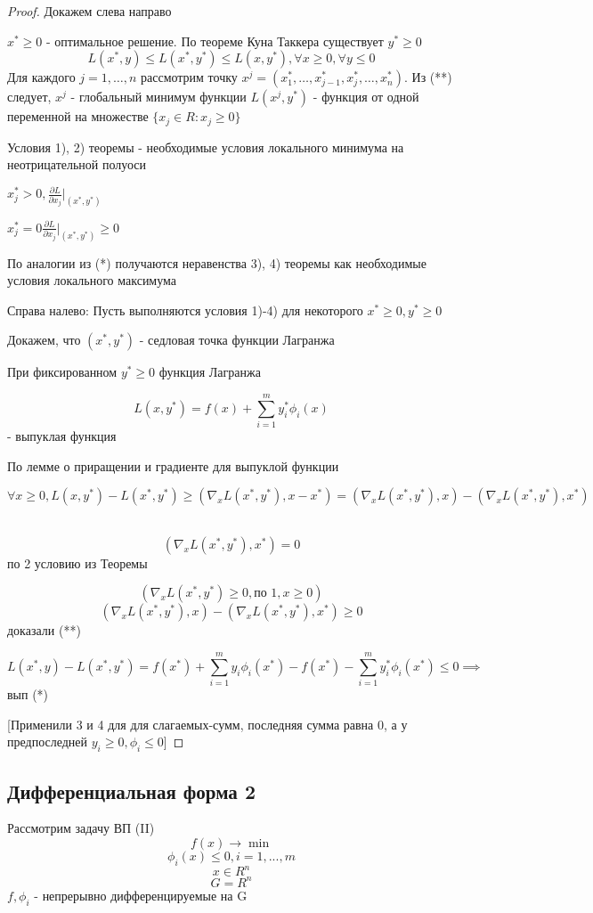 \documentclass[a4paper]{article}
\theoremstyle{definition}
\theoremstyle{remark}
\begin{document}
\begin{proof}
    Докажем слева направо 

    $x^*\ge 0$ - оптимальное решение. По теореме Куна Таккера существует $y^*\ge 0$
    \[L(x^*, y) \le L(x^*, y^*)\le L(x, y^*), \forall x\ge0, \forall y \le 0\]
    Для каждого $j = 1, \dots, n$ рассмотрим точку $x^j = (x_1^*,\dots, x_{j-1}^*, x_j^*, \dots, x_n^*)$. Из (**) следует, $x^j$ - глобальный минимум функции $L(x^j, y^*)$ - функция от одной переменной на множестве $ \{x_j\in R: x_j \ge 0\}$
    
    Условия 1), 2) теоремы - необходимые условия локального минимума на неотрицательной полуоси

    $x_j^* > 0, \frac{\partial L}{\partial x_j}|_{(x^*, y^*)}$

    $x_j^* = 0 \frac{\partial L}{\partial x_j}|_{(x^*, y^*)} \ge 0 $

    По аналогии из (*) получаются неравенства 3), 4) теоремы как необходимые условия локального максимума

    Справа налево: Пусть выполняются условия 1)-4) для некоторого $x^*\ge 0, y^*\ge 0$

    Докажем, что $(x^*, y^*)$ - седловая точка функции Лагранжа
    
    При фиксированном $y^*\ge 0 $ функция Лагранжа

    \[L(x, y^*) = f(x) + \sum_{i = 1}^m y_i^* \phi_i(x)\] - выпуклая функция

    По лемме о приращении и градиенте для выпуклой функции 

    \[\forall x\ge0, L(x, y^*) - L(x^*, y^*)\ge (\nabla_x L(x^*, y^*), x-x^*) = (\nabla_x L(x^*, y^*), x) - (\nabla_x L(x^*, y^*), x^*)\]\

    \[(\nabla_x L(x^*, y^*), x^*) = 0\] по 2 условию из Теоремы
    
    \[(\nabla_x L(x^*, y^*)\ge0, \text{по 1}, x\ge 0)\]
    \[(\nabla_x L(x^*, y^*), x) - (\nabla_x L(x^*, y^*), x^*) \ge 0\]
    доказали (**)

    \[L(x^*,  y) - L(x^*, y^*) = f(x^*) +\sum_{i=1}^{m}y_i \phi_i(x^*) - f(x^*) - \sum_{i= 1}^m y_i^* \phi_i(x^*) \le 0 \implies\]
    вып (*)

    [Применили 3 и 4 для для слагаемых-сумм, последняя сумма равна 0, а у предпоследней $y_i\ge0, \phi_i\le 0$]
\end{proof}
\subsection{Дифференциальная форма 2}
Рассмотрим задачу ВП (II)
\[f(x)\to \min\]
\[\phi_i(x)\le 0, i = 1, ..., m\]
\[x\in R^n\]
\[G = R^n\]
$f, \phi_i$ - непрерывно дифференцируемые на G
\end{document}
